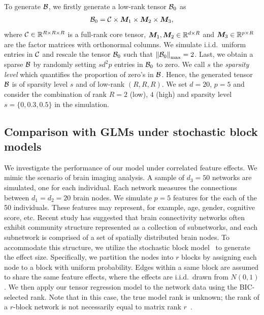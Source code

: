 \documentclass[12pt]{article}
\theoremstyle{definition}
\begin{document}
To generate $\mathcal{B}$, we firstly generate a low-rank tensor $\mathcal{B}_0$ as 
\begin{align}
    \mathcal{B}_0 = \mathcal{C} \times \bm M_1 \times \bm M_2 \times \bm M_3,
\end{align}
where $\mathcal{C} \in \mathbb{R}^{R \times R \times R}$ is a full-rank core tensor, $\bm M_1, \bm M_2 \in \mathbb{R}^{d \times R}$ and $\bm M_3 \in \mathbb{R}^{p \times R}$ are the factor matrices with orthonormal columns. We simulate i.i.d.\ uniform entries in $\mathcal{C}$ and rescale the tensor $\mathcal{B}_0$ such that $\left\lVert\mathcal{B}_0\right\rVert_{\max} = 2$. Last, we obtain a sparse $\mathcal{B}$ by randomly setting $sd^2p$ entries in $\mathcal{B}_0$ to zero. We call $s$ the \textit{sparsity level} which quantifies the proportion of zero's in $\mathcal{B}$. Hence, the generated tensor $\mathcal{B}$ is of sparsity level $s$ and of low-rank $(R,R,R)$. We set $d = 20$, $p = 5$ and consider the combination of rank $R = 2$ (low), $4$ (high) and sparsity level $s = \{0, 0.3,0.5\}$ in the simulation. 



\subsection{Comparison with GLMs under stochastic block models}
We investigate the performance of our model under correlated feature effects. We mimic the scenario of brain imaging analysis. A sample of $d_3=50$ networks are simulated, one for each individual. Each network measures the connections between $d_1=d_2=20$ brain nodes. We simulate $p=5$ features for the each of the 50 individuals. These features may represent, for example, age, gender, cognitive score, etc. Recent study has suggested that brain connectivity networks often exhibit community structure represented as a collection of subnetworks, and each subnetwork is comprised of a set of spatially distributed brain nodes. To accommodate this structure, we utilize the stochastic block model~\citep{abbe2017community} to generate the effect size. Specifically, we partition the nodes into $r$ blocks by assigning each node to a block with uniform probability. Edges within a same block are assumed to share the same feature effects, where the effects are i.i.d.\ drawn from $N(0,1)$. We then apply our tensor regression model to the network data using the BIC-selected rank. Note that in this case, the true model rank is unknown; the rank of a $r$-block network is not necessarily equal to matrix rank $r$~\citep{zeng2019multiway}. 
\end{document}
